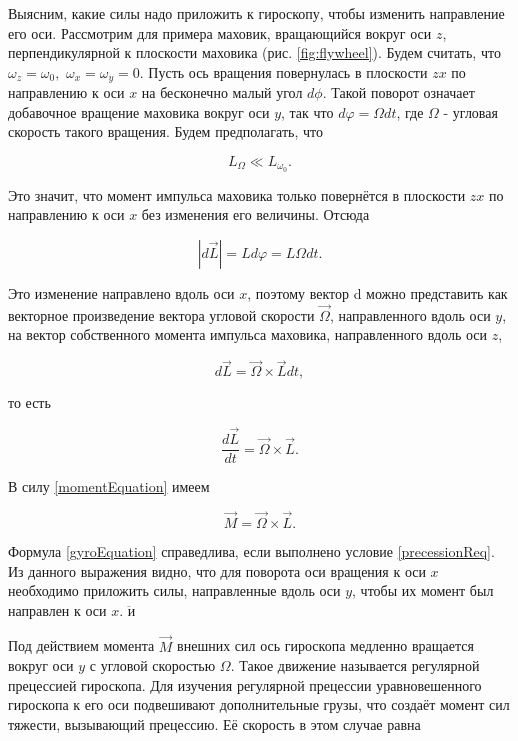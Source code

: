 \documentclass[a4paper,12pt]{article} %
\begin{document}
Выясним, какие силы надо приложить к гироскопу, чтобы изменить направление его оси. Рассмотрим для примера маховик, вращающийся вокруг оси $ z $, перпендикулярной к плоскости маховика (рис. \ref{fig:flywheel}). Будем считать, что $\omega_z = \omega_0, $ $\omega_x = \omega_y = 0 $. Пусть ось вращения повернулась в плоскости $ zx $ по направлению к оси $ x $ на бесконечно малый угол $ d\phi $. Такой поворот означает добавочное вращение маховика вокруг оси $ y $, так что $ d\varphi = \Omega dt $, где $ \Omega $ - угловая скорость такого вращения. Будем предполагать, что

\begin{equation}
    L_\Omega \ll L_{\omega_0}.
    \label{precessionReq}
\end{equation}

Это значит, что момент импульса маховика только повернётся в плоскости $ zx $ по направлению к оси $ x $ без изменения его величины. Отсюда

\begin{equation}
    |d\vec{L}| = L d\varphi = L\Omega dt. 
\end{equation}

Это изменение направлено вдоль оси $ x $, поэтому вектор d можно представить как векторное произведение вектора угловой скорости $ \vec{\Omega} $, направленного вдоль оси $ y $, на вектор собственного момента импульса маховика, направленного вдоль оси $ z $,

\begin{equation}
    d\vec{L} = \vec{\Omega} \times \vec{L} dt,
\end{equation}

то есть

\begin{equation}
    \frac{d\vec{L}}{dt} = \vec{\Omega} \times \vec{L}.
\end{equation}

В силу \eqref{momentEquation} имеем

\begin{equation}
    \vec{M} = \vec{\Omega} \times \vec{L}.
    \label{gyroEquation}
\end{equation}

Формула \eqref{gyroEquation} справедлива, если выполнено условие \eqref{precessionReq}. Из данного выражения видно, что для поворота оси вращения к оси $ x $ необходимо приложить силы, направленные вдоль оси $ y $, чтобы их момент был направлен к оси $ x $. $ \ddot{\text{и}}$

Под действием момента $ \vec{M} $ внешних сил ось гироскопа медленно вращается вокруг оси $ y $ с угловой скоростью $ \Omega $. Такое движение называется регулярной прецессией гироскопа. Для изучения регулярной прецессии уравновешенного гироскопа к его оси подвешивают дополнительные грузы, что создаёт момент сил тяжести, вызывающий прецессию. Её скорость в этом случае равна
\end{document}
